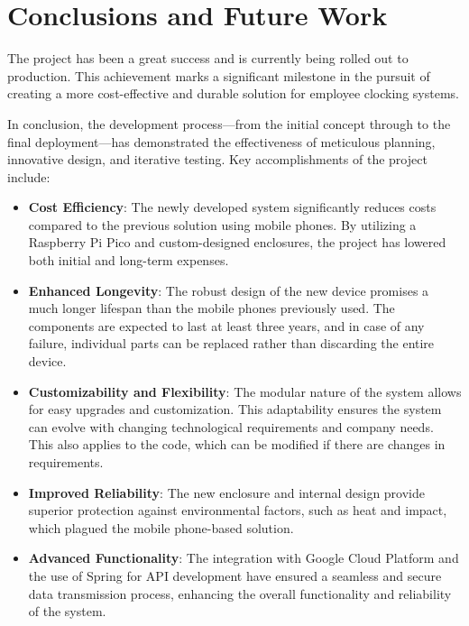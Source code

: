 \chapter{Conclusions and Future Work}
\label{cap:conclusions}

The project has been a great success and is currently being rolled out to production. This 
achievement marks a significant milestone in the pursuit of creating a more cost-effective and 
durable solution for employee clocking systems.

In conclusion, the development process—from the initial concept through to the final 
deployment—has demonstrated the effectiveness of meticulous planning, innovative design, and 
iterative testing. Key accomplishments of the project include:

\begin{itemize}
    \item \textbf{Cost Efficiency}: The newly developed system significantly reduces costs 
    compared to the previous solution using mobile phones. By utilizing a Raspberry Pi Pico and 
    custom-designed enclosures, the project has lowered both initial and long-term expenses.
    \item \textbf{Enhanced Longevity}: The robust design of the new device promises a much longer 
    lifespan than the mobile phones previously used. The components are expected to last at least 
    three years, and in case of any failure, individual parts can be replaced rather than 
    discarding the entire device.
    \item \textbf{Customizability and Flexibility}: The modular nature of the system allows for 
    easy upgrades and customization. This adaptability ensures the system can evolve with changing 
    technological requirements and company needs. This also applies to the code, which can be 
    modified if there are changes in requirements.
    \item \textbf{Improved Reliability}: The new enclosure and internal design provide superior 
    protection against environmental factors, such as heat and impact, which plagued the mobile 
    phone-based solution.
    \item \textbf{Advanced Functionality}: The integration with Google Cloud Platform and the use 
    of Spring for API development have ensured a seamless and secure data transmission process, 
    enhancing the overall functionality and reliability of the system.
\end{itemize}

